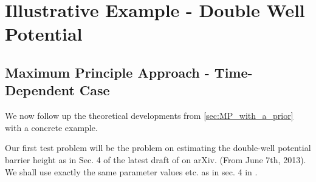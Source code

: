 \documentclass{article}
\begin{document}
% 
% 
% 
% 


\section{Illustrative Example - Double Well Potential}
\subsection{Maximum Principle Approach - Time-Dependent Case}
\label{sec:MP_Doublewell_TimeDependent}
We now follow up the theoretical developments from \cref{sec:MP_with_a_prior}
with a concrete example.

Our first test problem will be the problem on estimating the double-well
potential barrier height as in Sec. 4 of the latest draft of \cite{Lin} on
arXiv. (From June 7th, 2013). We shall use exactly the same parameter values
etc. as in sec. 4 in \cite{Lin}.
\end{document}
